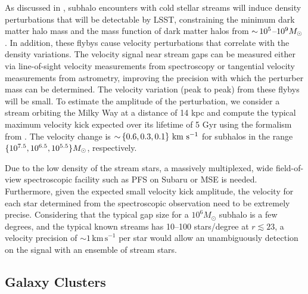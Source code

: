 As discussed in , subhalo encounters with cold stellar streams will induce density perturbations that will be detectable by LSST, constraining the minimum dark matter halo mass and the mass function of dark matter halos from $ {\sim}\,10^5$--$10^9 M_\odot$. In addition, these flybys cause velocity perturbations that correlate with the density variations.  The velocity signal near stream gaps can be measured either via line-of-sight velocity measurements from spectroscopy or tangential velocity measurements from astrometry, improving the precision with which the perturber mass can be determined.
The velocity variation (peak to peak) from these flybys will be small. To estimate the amplitude of the perturbation, we consider a stream orbiting the Milky Way at a distance of 14 kpc and compute the typical maximum velocity kick expected over its lifetime of 5 Gyr using the formalism from \citet{erkal2016}.  The velocity change is $ {\sim}\, \{0.6, 0.3, 0.1\} \mathrm{\,\mathrm{\,km}\,\mathrm{\,s}^{-1}}$ for subhalos in the range $\{ 10^{7.5}, 10^{6.5}, 10^{5.5} \} M_\odot$, respectively. %

Due to the low density of the stream stars, a massively multiplexed, wide field-of-view spectroscopic facility such as PFS on Subaru or MSE is needed. 
Furthermore, given the expected small velocity kick amplitude, the velocity for each star determined from the spectroscopic observation need to be extremely precise.
Considering that the typical gap size for a $10^6 M_\odot$ subhalo is a few degrees, and the typical known streams has 10--100 stars/degree at $r\lesssim23$\citep[see, e.g.,][]{pal5_gaps, gd1_deboer}, a velocity precision of $\sim1\,\mathrm{km\,s}^{-1}$ per star would allow an unambiguously detection on the signal with an ensemble of stream stars.  


\subsection{Galaxy Clusters }


